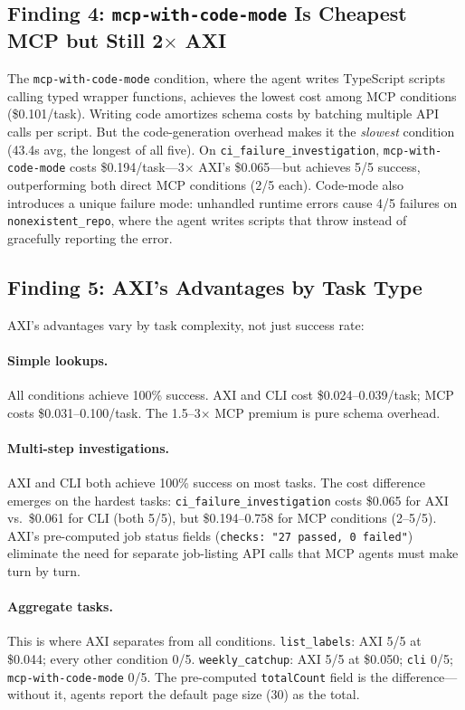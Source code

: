 \documentclass{article}
\begin{document}
\subsection{Finding 4: \texttt{mcp-with-code-mode} Is Cheapest MCP but Still 2$\times$ AXI}

The \texttt{mcp-with-code-mode} condition, where the agent writes TypeScript
scripts calling typed wrapper functions, achieves the lowest cost among MCP
conditions (\$0.101/task). Writing code amortizes schema costs by batching
multiple API calls per script. But the code-generation overhead makes it the
\emph{slowest} condition (43.4s avg, the longest of all five). On
\texttt{ci\_failure\_investigation}, \texttt{mcp-with-code-mode} costs \$0.194/task---3$\times$
AXI's \$0.065---but achieves 5/5 success, outperforming both direct MCP
conditions (2/5 each). Code-mode also introduces a unique failure mode:
unhandled runtime errors cause 4/5 failures on \texttt{nonexistent\_repo},
where the agent writes scripts that throw instead of gracefully reporting
the error.

\subsection{Finding 5: AXI's Advantages by Task Type}

AXI's advantages vary by task complexity, not just success rate:

\paragraph{Simple lookups.}
All conditions achieve 100\% success. AXI and CLI cost \$0.024--0.039/task;
MCP costs \$0.031--0.100/task. The 1.5--3$\times$ MCP premium is pure schema
overhead.

\paragraph{Multi-step investigations.}
AXI and CLI both achieve 100\% success on most tasks. The cost difference
emerges on the hardest tasks: \texttt{ci\_failure\_investigation} costs
\$0.065 for AXI vs.\ \$0.061 for CLI (both 5/5), but \$0.194--0.758 for MCP
conditions (2--5/5). AXI's pre-computed job status fields
(\texttt{checks: "27 passed, 0 failed"}) eliminate the need for separate
job-listing API calls that MCP agents must make turn by turn.

\paragraph{Aggregate tasks.}
This is where AXI separates from all conditions. \texttt{list\_labels}:
AXI 5/5 at \$0.044; every other condition 0/5. \texttt{weekly\_catchup}:
AXI 5/5 at \$0.050; \texttt{cli} 0/5; \texttt{mcp-with-code-mode} 0/5. The pre-computed
\texttt{totalCount} field is the difference---without it, agents report
the default page size (30) as the total.
\end{document}
